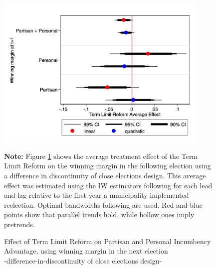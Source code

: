 \documentclass[12pt]{amsart}
\numberwithin{equation}{section}
\theoremstyle{definition}
\theoremstyle{definition}
\theoremstyle{definition}
\begin{document}
\begin{appendix}

\begin{figure}[h]   
\centering    
 \caption{Effect of Term Limit Reform on Partisan and Personal Incumbency Advantage, using winning margin in the next election \\ -difference-in-discontinuity of close elections design-}
 \label{fig:personal_vs_partisan_margin}
\includegraphics[width=0.9\textwidth]{Figures_incumbency/partisan_personal_inc_advantage_margin.png}
       \captionsetup{justification=centering}
         
 \textbf{Note:} Figure \ref{fig:personal_vs_partisan_margin} shows the average treatment effect of the Term Limit Reform on the winning margin in the following election using a difference in discontinuity of close elections design. This average effect was estimated using the IW estimators following \citet{abraham_sun_2020} for each lead and lag relative to the first year a municipality implemented reelection. Optimal bandwidths following \citet{calonicoetal_2014} are used. Red and blue points show that parallel trends hold, while hollow ones imply pretrends. 
\end{figure}           


\end{appendix}
\end{document}
